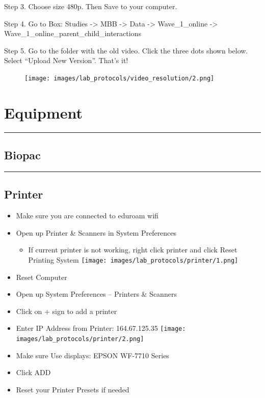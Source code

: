 \documentclass[
]{book}
\providecommand{\tightlist}{%
  \setlength{\itemsep}{0pt}\setlength{\parskip}{0pt}}
\begin{document}
Step 3. Choose size 480p. Then Save to your computer.

Step 4. Go to Box: Studies -\textgreater{} MBB -\textgreater{} Data -\textgreater{} Wave\_1\_online -\textgreater{} Wave\_1\_online\_parent\_child\_interactions

Step 5. Go to the folder with the old video. Click the three dots shown below. Select ``Upload New Version''. That's it!

\begin{figure}
\centering
\texttt{[image: images/lab\_protocols/video\_resolution/2.png]}
\caption{}
\end{figure}

\hypertarget{equipment}{%
\section{Equipment}\label{equipment}}

\begin{center}\rule{0.5\linewidth}{0.5pt}\end{center}

\hypertarget{biopac}{%
\subsection{Biopac}\label{biopac}}

\begin{center}\rule{0.5\linewidth}{0.5pt}\end{center}

\hypertarget{printer}{%
\subsection{Printer}\label{printer}}

\begin{itemize}
\item
  Make sure you are connected to eduroam wifi
\item
  Open up Printer \& Scanners in System Preferences

  \begin{itemize}
  \tightlist
  \item
    If current printer is not working, right click printer and click Reset Printing System
    \texttt{[image: images/lab\_protocols/printer/1.png]}
  \end{itemize}
\item
  Reset Computer
\item
  Open up System Preferences -- Printers \& Scanners
\item
  Click on + sign to add a printer
\item
  Enter IP Address from Printer: 164.67.125.35
  \texttt{[image: images/lab\_protocols/printer/2.png]}
\item
  Make sure Use displays: EPSON WF-7710 Series
\item
  Click ADD
\item
  Reset your Printer Presets if needed
\end{itemize}
\end{document}
